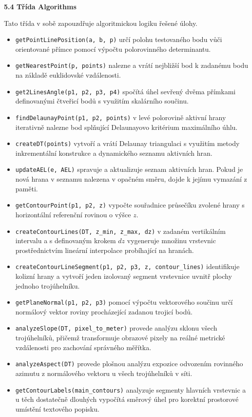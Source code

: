\documentclass[12pt]{article}
\begin{document}
\textbf{5.4 Třída Algorithms}

Tato třída v sobě zapouzdřuje algoritmickou logiku řešené úlohy.

\begin{itemize}
    \item \texttt{getPointLinePosition(a, b, p)} určí polohu testovaného bodu vůči orientované přímce pomocí výpočtu polorovinného determinantu.
    \item \texttt{getNearestPoint(p, points)} nalezne a vrátí nejbližší bod k zadanému bodu na základě euklidovské vzdálenosti.
    \item \texttt{get2LinesAngle(p1, p2, p3, p4)} spočítá úhel sevřený dvěma přímkami definovanými čtveřicí bodů s využitím skalárního součinu.
    \item \texttt{findDelaunayPoint(p1, p2, points)} v levé polorovině aktivní hrany iterativně nalezne bod splňující Delaunayovo kritérium maximálního úhlu.
    \item \texttt{createDT(points)} vytvoří a vrátí Delaunay triangulaci s využitím metody inkrementální konstrukce a dynamického seznamu aktivních hran.
    \item \texttt{updateAEL(e, AEL)} spravuje a aktualizuje seznam aktivních hran. Pokud je nová hrana v seznamu nalezena v opačném směru, dojde k jejímu vymazání z paměti.
    \item \texttt{getContourPoint(p1, p2, z)} vypočte souřadnice průsečíku zvolené hrany s horizontální referenční rovinou o výšce $z$.
    \item \texttt{createContourLines(DT, z\_min, z\_max, dz)} v zadaném vertikálním intervalu a s definovaným krokem $dz$ vygeneruje množinu vrstevnic prostřednictvím lineární interpolace probíhající na hranách.
    \item \texttt{createContourLineSegment(p1, p2, p3, z, contour\_lines)} identifikuje kolizní hrany a vytvoří jeden izolovaný segment vrstevnice uvnitř plochy jednoho trojúhelníku.
    \item \texttt{getPlaneNormal(p1, p2, p3)} pomocí výpočtu vektorového součinu určí normálový vektor roviny procházející zadanou trojicí bodů.
    \item \texttt{analyzeSlope(DT, pixel\_to\_meter)} provede analýzu sklonu všech trojúhelníků, přičemž transformuje obrazové pixely na reálné metrické vzdálenosti pro zachování správného měřítka.
    \item \texttt{analyzeAspect(DT)} provede plošnou analýzu expozice odvozením rovinného azimutu z normálového vektoru u všech trojúhelníků v síti.
    \item \texttt{getContourLabels(main\_contours)} analyzuje segmenty hlavních vrstevnic a u těch dostatečně dlouhých vypočítá směrový úhel pro korektní prostorové umístění textového popisku.
\end{itemize}
\end{document}

